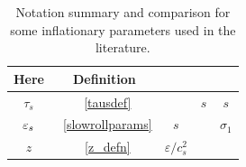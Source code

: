\begin{table}[h!]
  \begin{center}
    \begin{tabular}{ccccc}
        \toprule
        Here & Definition &~\cite{px_burrage}&~\cite{Hu_2011} &~\cite{warp_features_dbi}\\
        \midrule
        $\tau_s$ &~\eqref{tausdef} & ~ & $s$ & $s$ \\
        $\varepsilon_{s}$ &~\eqref{slowrollparams} & $s$ & ~ & $\sigma_1$ \\
        $z$ &~\eqref{z_defn} & $\varepsilon/c_s^2$ & ~ & ~ \\
        \bottomrule
    \end{tabular}
    \caption{
        Notation summary and comparison for some inflationary parameters
        used in the literature.
    }\label{tab:notation}
  \end{center}
\end{table}


